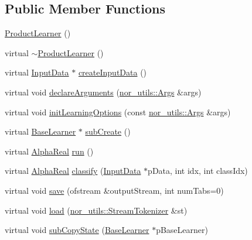 \subsection*{Public Member Functions}
\begin{DoxyCompactItemize}
\item 
\hyperlink{classMultiBoost_1_1ProductLearner_acea7edd1153d8737f1cdb830fc1ef234}{ProductLearner} ()
\item 
virtual \hyperlink{classMultiBoost_1_1ProductLearner_a5a46d8f7e414df67bd65ec5a2b7ed7f6}{$\sim$ProductLearner} ()
\item 
virtual \hyperlink{classMultiBoost_1_1InputData}{InputData} $\ast$ \hyperlink{classMultiBoost_1_1ProductLearner_a46f134cfe65e2af6cb6586db5c3bcd94}{createInputData} ()
\item 
virtual void \hyperlink{classMultiBoost_1_1ProductLearner_ad24d70df2c31dcf3b50f08b3185e70c6}{declareArguments} (\hyperlink{classnor__utils_1_1Args}{nor\_\-utils::Args} \&args)
\item 
virtual void \hyperlink{classMultiBoost_1_1ProductLearner_a989a5e499888f109046acfa5a4edf90a}{initLearningOptions} (const \hyperlink{classnor__utils_1_1Args}{nor\_\-utils::Args} \&args)
\item 
virtual \hyperlink{classMultiBoost_1_1BaseLearner}{BaseLearner} $\ast$ \hyperlink{classMultiBoost_1_1ProductLearner_ae47d69c6e4bbed0d773ee4f87e44d386}{subCreate} ()
\item 
virtual \hyperlink{Defaults_8h_a80184c4fd10ab70a1a17c5f97dcd1563}{AlphaReal} \hyperlink{classMultiBoost_1_1ProductLearner_a5904600edaf57af0c4e10088cc7279a7}{run} ()
\item 
virtual \hyperlink{Defaults_8h_a80184c4fd10ab70a1a17c5f97dcd1563}{AlphaReal} \hyperlink{classMultiBoost_1_1ProductLearner_a6ebf313eddcc25f3759aff180b78d919}{classify} (\hyperlink{classMultiBoost_1_1InputData}{InputData} $\ast$pData, int idx, int classIdx)
\item 
virtual void \hyperlink{classMultiBoost_1_1ProductLearner_a98a8d98a95aa5f6ed736c55d1d2b866f}{save} (ofstream \&outputStream, int numTabs=0)
\item 
virtual void \hyperlink{classMultiBoost_1_1ProductLearner_a8c6ccbf794ed15b2ae4fa5b6764b3c7f}{load} (\hyperlink{classnor__utils_1_1StreamTokenizer}{nor\_\-utils::StreamTokenizer} \&st)
\item 
virtual void \hyperlink{classMultiBoost_1_1ProductLearner_af97192ceef5dcdcaa2a2d1fe7c722cb7}{subCopyState} (\hyperlink{classMultiBoost_1_1BaseLearner}{BaseLearner} $\ast$pBaseLearner)
\end{DoxyCompactItemize}
